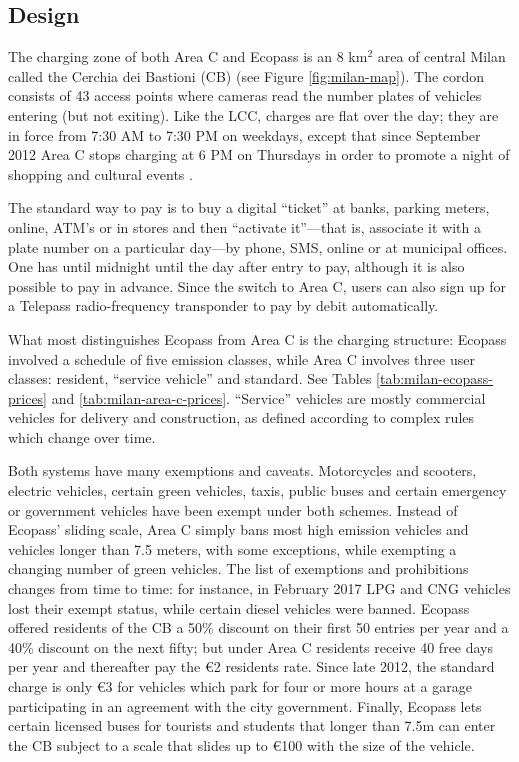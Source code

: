 \subsection{Design}

The charging zone of both Area C and Ecopass is an 8 km$^{2}$ area of central Milan called the Cerchia dei Bastioni (CB) (see Figure \ref{fig:milan-map}). The cordon consists of 43 access points where cameras read the number plates of vehicles entering (but not exiting). Like the LCC, charges are flat over the day; they are in force from 7:30 AM to 7:30 PM on weekdays, except that since September 2012 Area C stops charging at 6 PM on Thursdays in order to promote a night of shopping and cultural events \citep{CorriereDellaSera2012}. 

The standard way to pay is to buy a digital ``ticket'' at banks, parking meters, online, ATM's or in stores and then ``activate it''---that is, associate it with a plate number on a particular day---by phone, SMS, online or at municipal offices. One has until midnight until the day after entry to pay, although it is also possible to pay in advance. Since the switch to Area C, users can also sign up for a Telepass radio-frequency transponder to pay by debit automatically. 

What most distinguishes Ecopass from Area C is the charging structure: Ecopass involved a schedule of five emission classes, while Area C involves three user classes: resident, ``service vehicle'' and standard. See Tables \ref{tab:milan-ecopass-prices} and \ref{tab:milan-area-c-prices}. ``Service'' vehicles are mostly commercial vehicles for delivery and construction, as defined according to complex rules which change over time. 

Both systems have many exemptions and caveats. Motorcycles and scooters, electric vehicles, certain green vehicles, taxis, public buses and certain emergency or government vehicles have been exempt under both schemes. Instead of Ecopass' sliding scale, Area C simply bans most high emission vehicles and vehicles longer than 7.5 meters, with some exceptions, while exempting a changing number of green vehicles. The list of exemptions and prohibitions changes from time to time: for instance, in February 2017 LPG and CNG vehicles lost their exempt status, while certain diesel vehicles were banned. Ecopass offered residents of the CB a 50\% discount on their first 50 entries per year and a 40\% discount on the next fifty; but under Area C residents receive 40 free days per year and thereafter pay the \euro 2 residents rate. Since late 2012, the standard charge is only \euro3 for vehicles which park for four or more hours at a garage participating in an agreement with the city government. Finally, Ecopass lets certain licensed buses for tourists and students that longer than 7.5m can enter the CB subject to a scale that slides up to \euro 100 with the size of the vehicle.

